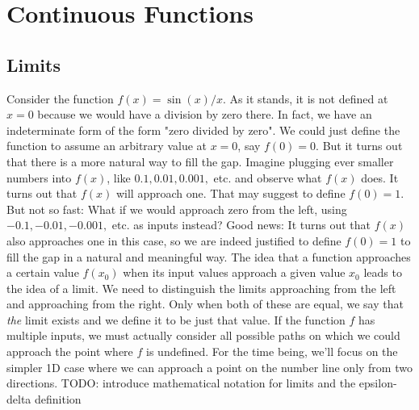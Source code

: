 \section{Continuous Functions}

\subsection{Limits}
Consider the function $f(x) = \sin (x) / x$. As it stands, it is not defined at $x = 0$ because we would have a division by zero there. In fact, we have an indeterminate form of the form "zero divided by zero". We could just define the function to assume an arbitrary value at $x = 0$, say $f(0) = 0$. But it turns out that there is a more natural way to fill the gap. Imagine plugging ever smaller numbers into $f(x)$, like $0.1, 0.01, 0.001, $ etc. and observe what $f(x)$ does. It turns out that $f(x)$ will approach one. That may suggest to define $f(0) = 1$. But not so fast: What if we would approach zero from the left, using $-0.1, -0.01, -0.001,$ etc. as inputs instead? Good news: It turns out that $f(x)$ also approaches one in this case, so we are indeed justified to define $f(0)=1$ to fill the gap in a natural and meaningful way. The idea that a function approaches a certain value $f(x_0)$ when its input values approach a given value $x_0$ leads to the idea of a limit. We need to distinguish the limits approaching from the left and approaching from the right. Only when both of these are equal, we say that \emph{the} limit exists and we define it to be just that value. If the function $f$ has multiple inputs, we must actually consider all possible paths on which we could approach the point where $f$ is undefined. For the time being, we'll focus on the simpler 1D case where we can approach a point on the number line only from two directions.
TODO: introduce mathematical notation for limits and the epsilon-delta definition






